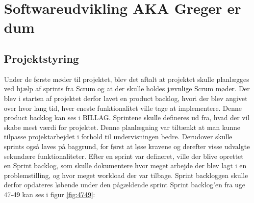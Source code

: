 \section{Softwareudvikling AKA Greger er dum}
\subsection{Projektstyring}
Under de første møder til projektet, blev det aftalt at projektet skulle planlægges ved hjælp af sprints fra Scrum og at der skulle holdes jævnlige Scrum møder.
\newline
Der blev i starten af projektet derfor lavet en product backlog, hvori der blev angivet over hvor lang tid, hver eneste funktionalitet ville tage at implementere. Denne product backlog kan ses i BILLAG.
\newline
Sprintene skulle defineres ud fra, hvad der vil skabe mest værdi for projektet. Denne planlægning var tiltænkt at man kunne tilpasse projektarbejdet i forhold til undervisningen bedre. Derudover skulle sprints også laves på baggrund, for først at løse kravene og derefter visse udvalgte sekundære funktionaliteter.
\newline
Efter en sprint var defineret, ville der blive oprettet en Sprint backlog, som skulle dokumentere hvor meget arbejde der blev lagt i en problemstilling, og hvor meget workload der var tilbage. Sprint backloggen skulle derfor opdateres løbende under den pågældende sprint Sprint backlog'en fra uge 47-49 kan ses i figur \ref{fig:4749}:
